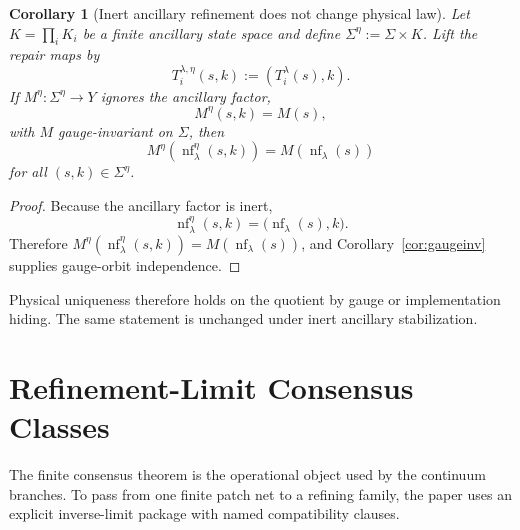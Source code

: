 \documentclass[11pt]{article}
\newtheorem{corollary}[theorem]{Corollary}
\theoremstyle{remark}
\theoremstyle{plain}
\begin{document}
\begin{corollary}[Inert ancillary refinement does not change physical law]\label{cor:ancilla}
Let \(K=\prod_i K_i\) be a finite ancillary state space and define \(\Sigma^\eta:=\Sigma\times K\). Lift the repair maps by
\[
T_i^{\lambda,\eta}(s,k):=(T_i^\lambda(s),k).
\]
If \(M^\eta:\Sigma^\eta\to Y\) ignores the ancillary factor,
\[
M^\eta(s,k)=M(s),
\]
with \(M\) gauge-invariant on \(\Sigma\), then
\[
M^\eta(\operatorname{nf}_\lambda^\eta(s,k))
=
M(\operatorname{nf}_\lambda(s))
\]
for all \((s,k)\in\Sigma^\eta\).
\end{corollary}

\begin{proof}
Because the ancillary factor is inert,
\[
\operatorname{nf}_\lambda^\eta(s,k)=\bigl(\operatorname{nf}_\lambda(s),k\bigr).
\]
Therefore \(M^\eta(\operatorname{nf}_\lambda^\eta(s,k))=M(\operatorname{nf}_\lambda(s))\), and Corollary~\ref{cor:gaugeinv} supplies gauge-orbit independence.
\end{proof}

Physical uniqueness therefore holds on the quotient by gauge or implementation hiding. The same
statement is unchanged under inert ancillary stabilization.


\section{Refinement-Limit Consensus Classes}
\label{sec:refinement-consensus}

The finite consensus theorem is the operational object used by the continuum branches. To pass
from one finite patch net to a refining family, the paper uses an explicit inverse-limit package
with named compatibility clauses.
\end{document}
